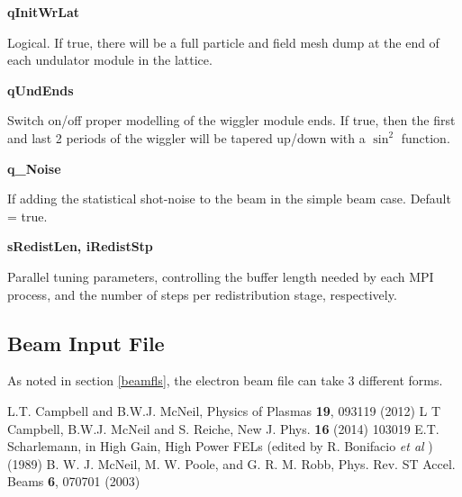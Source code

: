 \documentclass[12pt]{article}%
\begin{document}
{\bf qInitWrLat}

Logical. If true, there will be a full particle and field mesh dump at the end of each undulator module in the lattice.

{\bf qUndEnds}

Switch on/off proper modelling of the wiggler module ends. If true, then the first and last 2 periods of the wiggler will be tapered up/down with a $\sin^2$ function.

{\bf q\_Noise}

If adding the statistical shot-noise to the beam in the simple beam case. Default = true.

{\bf sRedistLen, iRedistStp}

Parallel tuning parameters, controlling the buffer length needed by each MPI process, and the number of steps per redistribution stage, respectively.

\newpage

\subsection{Beam Input File}

As noted in section \ref{beamfls}, the electron beam file can take 3 different forms.


\newpage

\begin{thebibliography}{10}

L.T. Campbell and B.W.J. McNeil, Physics of Plasmas {\bf 19}, 093119 (2012)
L T Campbell, B.W.J. McNeil and S. Reiche, New J. Phys. {\bf 16} (2014) 103019
E.T. Scharlemann, in High Gain, High Power FELs (edited by R. Bonifacio \textit{et al} ) (1989)
B. W. J. McNeil, M. W. Poole, and G. R. M. Robb, Phys. Rev. ST Accel. Beams {\bf 6}, 070701 (2003)


\end{thebibliography}
\end{document}

